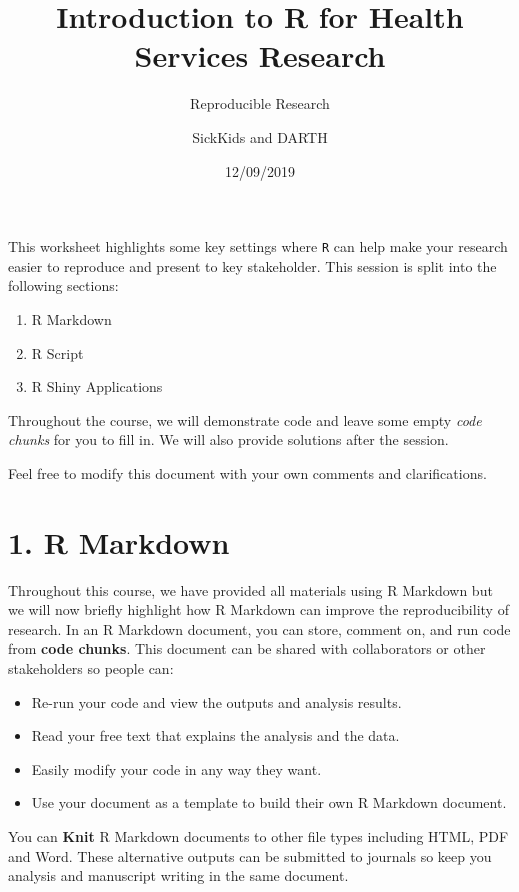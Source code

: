 \documentclass[
]{article}
\title{Introduction to R for Health Services Research}
\subtitle{Reproducible Research}
\author{SickKids and DARTH}
\date{12/09/2019}
\begin{document}
\maketitle

This worksheet highlights some key settings where \texttt{R} can help
make your research easier to reproduce and present to key stakeholder.
This session is split into the following sections:

\begin{enumerate}
\def\labelenumi{\arabic{enumi}.}
\item
  R Markdown
\item
  R Script
\item
  R Shiny Applications
\end{enumerate}

Throughout the course, we will demonstrate code and leave some empty
\emph{code chunks} for you to fill in. We will also provide solutions
after the session.

Feel free to modify this document with your own comments and
clarifications.

\hypertarget{r-markdown}{%
\section{1. R Markdown}\label{r-markdown}}

Throughout this course, we have provided all materials using R Markdown
but we will now briefly highlight how R Markdown can improve the
reproducibility of research. In an R Markdown document, you can store,
comment on, and run code from \textbf{code chunks}. This document can be
shared with collaborators or other stakeholders so people can:

\begin{itemize}
\item
  Re-run your code and view the outputs and analysis results.
\item
  Read your free text that explains the analysis and the data.
\item
  Easily modify your code in any way they want.
\item
  Use your document as a template to build their own R Markdown
  document.
\end{itemize}

You can \textbf{Knit} R Markdown documents to other file types including
HTML, PDF and Word. These alternative outputs can be submitted to
journals so keep you analysis and manuscript writing in the same
document.
\end{document}
